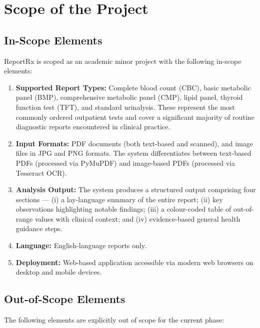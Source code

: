\section{Scope of the Project}

\subsection{In-Scope Elements}
ReportRx is scoped as an academic minor project with the following in-scope elements:

\begin{enumerate}
    \item \textbf{Supported Report Types:} Complete blood count (CBC), basic metabolic panel (BMP), comprehensive metabolic panel (CMP), lipid panel, thyroid function test (TFT), and standard urinalysis. These represent the most commonly ordered outpatient tests and cover a significant majority of routine diagnostic reports encountered in clinical practice.
    \item \textbf{Input Formats:} PDF documents (both text-based and scanned), and image files in JPG and PNG formats. The system differentiates between text-based PDFs (processed via PyMuPDF) and image-based PDFs (processed via Tesseract OCR).
    \item \textbf{Analysis Output:} The system produces a structured output comprising four sections --- (i) a lay-language summary of the entire report; (ii) key observations highlighting notable findings; (iii) a colour-coded table of out-of-range values with clinical context; and (iv) evidence-based general health guidance steps.
    \item \textbf{Language:} English-language reports only.
    \item \textbf{Deployment:} Web-based application accessible via modern web browsers on desktop and mobile devices.
\end{enumerate}

\subsection{Out-of-Scope Elements}
The following elements are explicitly out of scope for the current phase:

